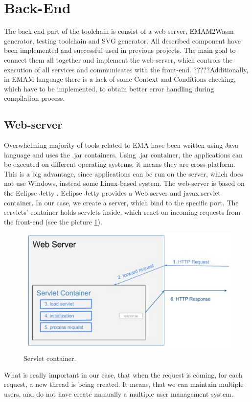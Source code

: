 \section{Back-End}
The back-end part of the toolchain is consist of a web-server, EMAM2Wasm generator, testing toolchain and SVG generator. All described component have been implemented and successful used in previous projects. The main goal to connect them all together and implement the web-server, which controls the execution of all services and communicates with the front-end. ?????Additionally, in EMAM language there is a lack of some Context and Conditions checking, which have to be implemented, to obtain better error handling during compilation process.
\subsection{Web-server}
Overwhelming majority of tools related to EMA have been written using Java language and uses the .jar containers. Using .jar container, the applications can be executed on different operating systems, it means they are cross-platform. This is a big advantage, since applications can be run on the server, which does not use Windows, instead some Linux-based system. The web-server is based on the Eclipse Jetty \cite{Jetty}. Eclipse Jetty provides a Web server and javax.servlet container. In our case, we create a server, which bind to the specific port. The servlets' container holds servlets inside, which react on incoming requests from the front-end (see the picture \ref{fig:servlet}). \newline
\begin{figure}[h!]
    \centering
    \includegraphics[width=0.6\linewidth]{src/pic/servlet-container-life-cycle}
    \caption{Servlet container.}
    \label{fig:servlet}
\end{figure} \newline
What is really important in our case, that when the request is coming, for each request, a new thread is being created. It means, that we can maintain multiple users, and do not have create manually a multiple user management system. \newline
